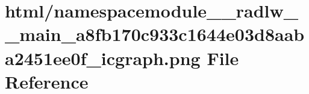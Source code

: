 \hypertarget{namespacemodule____radlw____main__a8fb170c933c1644e03d8aaba2451ee0f__icgraph_8png}{}\section{html/namespacemodule\+\_\+\+\_\+radlw\+\_\+\+\_\+main\+\_\+a8fb170c933c1644e03d8aaba2451ee0f\+\_\+icgraph.png File Reference}
\label{namespacemodule____radlw____main__a8fb170c933c1644e03d8aaba2451ee0f__icgraph_8png}
